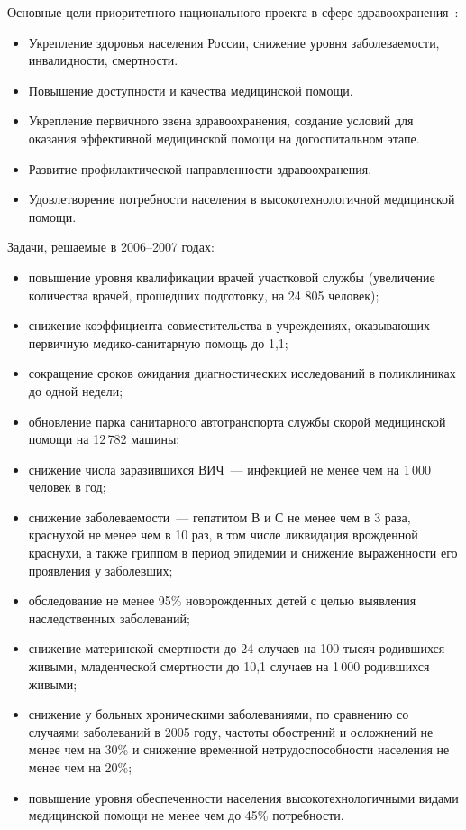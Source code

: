 \documentclass[article, 12pt, russian, oneside]{ncc}
\begin{document}
Основные цели приоритетного национального проекта в сфере
здравоохранения~\cite{Health_Goals}:

\begin{itemize}
\item Укрепление здоровья населения России, снижение уровня
  заболеваемости, инвалидности, смертности.
\item Повышение доступности и качества медицинской помощи.
\item Укрепление первичного звена здравоохранения, создание условий
  для оказания эффективной медицинской помощи на догоспитальном этапе.
\item Развитие профилактической направленности здравоохранения.
\item Удовлетворение потребности населения в высокотехнологичной
  медицинской помощи.
\end{itemize}

Задачи, решаемые в 2006--2007 годах:

\begin{itemize}
\item повышение уровня квалификации врачей участковой службы
  (увеличение количества врачей, прошедших подготовку, на 24 805
  человек);
\item снижение коэффициента совместительства в учреждениях,
  оказывающих первичную медико-санитарную помощь до 1,1;
\item сокращение сроков ожидания диагностических исследований в
  поликлиниках до одной недели;
\item обновление парка санитарного автотранспорта службы скорой
  медицинской помощи на 12\,782 машины;
\item снижение числа заразившихся ВИЧ~--- инфекцией не менее чем на
  1\,000 человек в год;
\item снижение заболеваемости~--- гепатитом В и С не менее чем в 3
  раза, краснухой не менее чем в 10 раз, в том числе ликвидация
  врожденной краснухи, а также гриппом в период эпидемии и снижение
  выраженности его проявления у заболевших;
\item обследование не менее 95\% новорожденных детей с целью выявления
  наследственных заболеваний;
\item снижение материнской смертности до 24 случаев на 100 тысяч
  родившихся живыми, младенческой смертности до 10,1 случаев на 1\,000
  родившихся живыми;
\item снижение у больных хроническими заболеваниями, по сравнению со
  случаями заболеваний в 2005 году, частоты обострений и осложнений не
  менее чем на 30\% и снижение временной нетрудоспособности населения
  не менее чем на 20\%;
\item повышение уровня обеспеченности населения высокотехнологичными
  видами медицинской помощи не менее чем до 45\% потребности.
\end{itemize}
\end{document}
